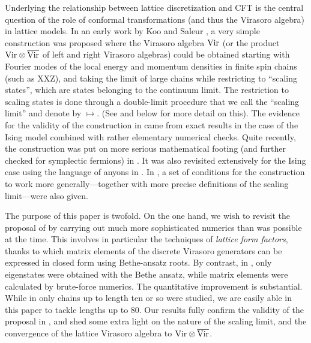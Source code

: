 \documentclass[a4paper,10pt]{article}
\newcommand{\VirN}{\hbox{Vir}\otimes\overline{\hbox{Vir}}}
\newcommand{\Vir}{\hbox{Vir}}
\begin{document}
Underlying the relationship between lattice discretization and CFT is the central question of the role of conformal transformations (and  thus the Virasoro algebra) in lattice models. In an early work by Koo and Saleur \cite{KooSaleur}, a very simple construction was proposed where the Virasoro algebra $\Vir$ (or the product $\VirN$ of left and right Virasoro algebras) could be  obtained starting with Fourier modes of the local energy and momentum densities in finite spin chains (such as  XXZ), and taking  the limit of large chains while restricting to ``scaling states'', which are states belonging to the continuum limit. The restriction to scaling states is done through a double-limit procedure that we call the ``scaling limit'' and denote by $\mapsto$. (See \cite{KooSaleur} and below for more detail on this). The evidence for the validity of the construction in \cite{KooSaleur} came from exact results in the case of the Ising model combined with rather elementary numerical checks. Quite recently, the construction was put on more serious mathematical footing (and further checked for symplectic fermions) in  \cite{GRS1,GRS2,GRS3}. It was also revisited extensively  for the Ising case using the language of anyons in \cite{Wang}. In \cite{Wang}, a set of conditions for the construction to work more generally---together with more precise definitions of the scaling limit---were also given.

The purpose of this paper is twofold. On the one hand, we wish to revisit the proposal of \cite{KooSaleur} by carrying out much more sophisticated numerics than was possible at the time. This involves in particular the techniques of {\sl lattice form factors}, thanks to which matrix elements of the discrete Virasoro generators can be expressed in closed form using Bethe-ansatz roots. By contrast, in \cite{KooSaleur}, only eigenstates were obtained with the Bethe ansatz, while matrix elements were calculated by brute-force numerics. The quantitative improvement is substantial. While in \cite{KooSaleur} only chains up to length ten or so  were studied, we are easily able in this paper to tackle lengths up to 80. Our results fully confirm the validity of the proposal in \cite{KooSaleur}, and shed some extra light on the nature of the scaling limit, and the convergence of the lattice Virasoro algebra to $\VirN$.
\end{document}
